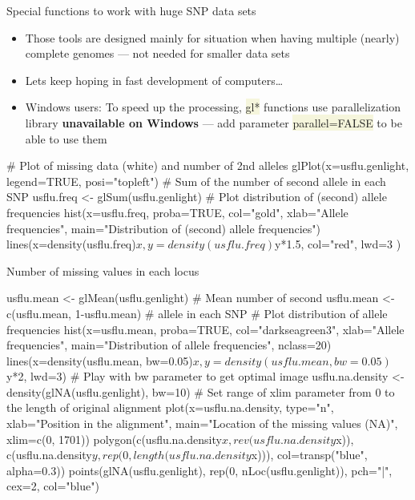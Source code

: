 \documentclass[compress, xelatex, 11pt, xcolor=svgnames, aspectratio=169, url={hyphens, lowtilde}]{beamer}
\renewcommand{\texttt}[1]{\colorbox{Beige}{{\ttfamily #1}}}
\begin{document}
\begin{frame}[fragile]{Special functions to work with huge SNP data sets}
	\begin{itemize}
		\item Those tools are designed mainly for situation when having multiple (nearly) complete genomes --- not needed for smaller data sets
		\item Lets keep hoping in fast development of computers\ldots
		\item \alert{Windows users:} To speed up the processing, \texttt{gl*} functions use parallelization library \textbf{unavailable on Windows} --- add parameter \texttt{parallel=FALSE} to be able to use them
	\end{itemize}
	\begin{spluscode}
    # Plot of missing data (white) and number of 2nd alleles
    glPlot(x=usflu.genlight, legend=TRUE, posi="topleft")
    # Sum of the number of second allele in each SNP
    usflu.freq <- glSum(usflu.genlight)
    # Plot distribution of (second) allele frequencies
    hist(x=usflu.freq, proba=TRUE, col="gold", xlab="Allele frequencies",
      main="Distribution of (second) allele frequencies")
    lines(x=density(usflu.freq)$x, y=density(usflu.freq)$y*1.5, col="red",
      lwd=3 )
	\end{spluscode}
\end{frame}

\begin{frame}[fragile]{Number of missing values in each locus}
	\begin{spluscode}
    usflu.mean <- glMean(usflu.genlight)      # Mean number of second
    usflu.mean <- c(usflu.mean, 1-usflu.mean) # allele in each SNP
    # Plot distribution of allele frequencies
    hist(x=usflu.mean, proba=TRUE, col="darkseagreen3", xlab="Allele
      frequencies", main="Distribution of allele frequencies", nclass=20)
    lines(x=density(usflu.mean, bw=0.05)$x, y=density(usflu.mean, bw=0.05)$y*2,
      lwd=3)
    # Play with bw parameter to get optimal image
    usflu.na.density <- density(glNA(usflu.genlight), bw=10)
    # Set range of xlim parameter from 0 to the length of original alignment
    plot(x=usflu.na.density, type="n", xlab="Position in the alignment",
      main="Location of the missing values (NA)", xlim=c(0, 1701))
    polygon(c(usflu.na.density$x, rev(usflu.na.density$x)),
      c(usflu.na.density$y, rep(0, length(usflu.na.density$x))),
      col=transp("blue", alpha=0.3))
    points(glNA(usflu.genlight), rep(0, nLoc(usflu.genlight)), pch="|", cex=2,
      col="blue")
	\end{spluscode}
\end{frame}
\end{document}
